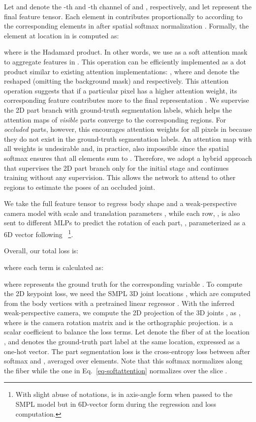 \documentclass[10pt,twocolumn,letterpaper,usenames,dvipsnames]{article}
\begin{document}
Let  and  denote the -th and -th channel of  and , respectively, and let  represent the final feature tensor. 
Each element in  contributes proportionally to  according to the corresponding elements in  after spatial softmax normalization . 
Formally, the element at location  in  is computed as:

where  is the Hadamard product. 
In other words, we use  as a soft attention mask to aggregate features in .
This operation can be efficiently implemented as a dot product similar to existing attention implementations: , where  and  denote the reshaped  (omitting the background mask) and  respectively. This attention operation suggests that if a particular pixel has a higher attention weight, its corresponding feature contributes more to the final representation . 
We supervise the 2D part branch  with ground-truth segmentation labels, which helps the attention maps of \emph{visible} parts converge to the corresponding regions.
For \emph{occluded} parts, however, this encourages  attention weights for all pixels in  because they do not exist in the ground-truth segmentation labels. 
An attention map with all  weights is undesirable and, in practice, also impossible since the spatial softmax ensures that all elements sum to .
Therefore, we adopt a hybrid approach that supervises the 2D part branch only for the initial stage and continues training without any supervision. This allows the network to attend to other regions to estimate the poses of an occluded joint.

We take the full feature tensor  to regress body shape  and a weak-perspective camera model with scale and translation parameters , while each row, , is also sent to different MLPs to predict the rotation of each part, , parameterized as a 6D vector following~\cite{kocabas2019vibe,SPIN:ICCV:2019} \footnote{With slight abuse of notations,  is in axis-angle form when passed to the SMPL model but in 6D-vector form during the regression and loss computation.}.

Overall, our total loss is: 

where each term is calculated as:

where  represents the ground truth for the corresponding variable . 
To compute the 2D keypoint loss, we need the SMPL 3D joint locations , which are computed from the body vertices with a pretrained linear regressor .
With the inferred weak-perspective camera, we compute the 2D projection of the 3D joints , as
, where  is the camera rotation matrix and  is the orthographic projection.  is a scalar coefficient to balance the loss terms. 
Let  denote the fiber
of  at the location , 
and  denotes the ground-truth part label at the same location, expressed as a one-hot vector.
The part segmentation loss  is the cross-entropy loss between  after softmax and , averaged over  elements. 
Note that this softmax normalizes along the fiber  while the one in Eq.~\ref{eq-softattention} normalizes over the slice .
\end{document}
